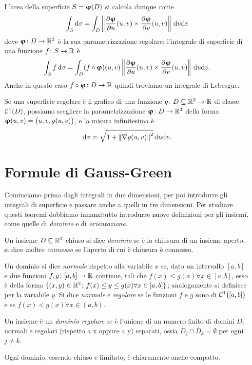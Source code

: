 L'area della superficie $S=\bm{\upvarphi}(D)$ si calcola dunque come
\begin{equation}
	\int_S\textup{d}\sigma=\int_D\left\|{\frac{\partial {\bm{\upvarphi}}}{\partial {u}}(u,v)\times\frac{\partial {\bm{\upvarphi}}}{\partial {v}}(u,v)}\right\|\,\textup{d} u\textup{d} v
\end{equation}
dove $\bm{\upvarphi}\colon D\to\mathbb{R}^3$ è la sua parametrizzazione regolare; l'integrale di superficie di una funzione $f\colon S\to\mathbb{R}$ è
\begin{equation}
	\int_Sf\,\textup{d}\sigma=\int_D(f\circ\bm{\upvarphi})(u,v)\left\|{\frac{\partial {\bm{\upvarphi}}}{\partial {u}}(u,v)\times\frac{\partial {\bm{\upvarphi}}}{\partial {v}}(u,v)}\right\|\,\textup{d} u\textup{d} v.
\end{equation}
Anche in questo caso $f\circ\bm{\upvarphi}\colon D\to\mathbb{R}$ quindi troviamo un integrale di Lebesgue.

Se una superficie regolare è il grafico di una funzione $g\colon D\subseteq\mathbb{R}^2\to\mathbb{R}$ di classe $\mathcal{C}^{{1}}(D)$, possiamo scegliere la parametrizzazione $\bm{\upvarphi}\colon D\to\mathbb{R}^3$ della forma $\bm{\upvarphi}(u,v)=\big(u,v,g(u,v)\big)$, e la misura infinitesima è
\begin{equation}
	\textup{d}\sigma=\sqrt{1+\left\|{\nabla g(u,v)}\right\|^2}\,\textup{d} u\textup{d} v.
\end{equation}

\section{Formule di Gauss-Green}
Cominciamo prima dagli integrali in due dimensioni, per poi introdurre gli integrali di superficie e passare anche a quelli in tre dimensioni.
Per studiare questi teoremi dobbiamo innanzitutto introdurre nuove definizioni per gli insiemi, come quelle di \emph{dominio} e di \emph{orientazione}.
\begin{definizione} \label{d:dominio}
	Un insieme $D\subseteq\mathbb{R}^2$ chiuso si dice \emph{dominio} se è la chiusura di un insieme aperto; si dice inoltre \emph{connesso} se l'aperto di cui è chiusura è connesso.
\end{definizione}
\begin{definizione} \label{d:dominio-norm-reg}
	Un dominio si dice \emph{normale} rispetto alla variabile $x$ se, dato un intervallo $[a,b]$ e due funzioni $f,g\colon[a,b]\to\mathbb{R}$ continue, tali che $f(x)\leq g(x) \forall x\in[a,b]$, esso è della forma $\{(x,y)\in\mathbb{R}^2\colon f(x)\leq y\leq g(x) \forall x\in[a,b]\}$; analogamente si definisce per la variabile $y$.
	Si dice \emph{normale} e \emph{regolare} se le funzioni $f$ e $g$ sono di $\mathcal{C}^{{1}}\big([a,b]\big)$ e se $f(x)<g(x) \forall x\in(a,b)$.
\end{definizione}
\begin{definizione} \label{d:dominio-regolare}
	Un insieme è un \emph{dominio regolare} se è l'unione di un numero finito di domini $D_i$ normali e regolari (rispetto a x oppure a y) separati, ossia $\mathring{D_j}\cap\mathring{D_k}=\emptyset$ per ogni $j\neq k$.
\end{definizione}
Ogni dominio, essendo chiuso e limitato, è chiaramente anche compatto.

